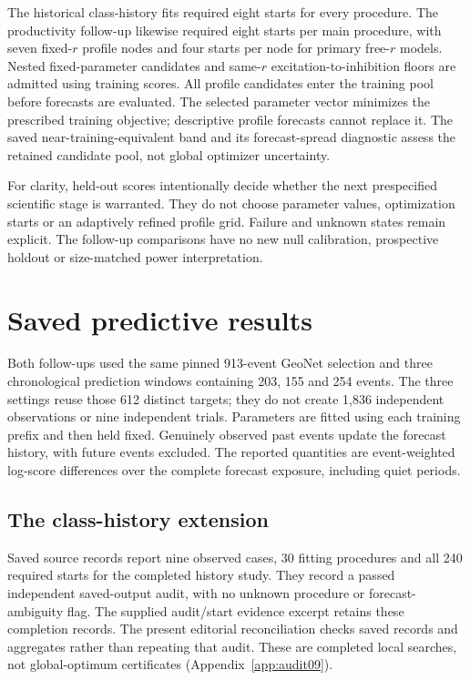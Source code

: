 The historical class-history fits required eight starts for every
procedure. The productivity follow-up likewise required eight starts per
main procedure, with seven fixed-\(r\) profile nodes and four starts per
node for primary free-\(r\) models. Nested fixed-parameter candidates and
same-\(r\) excitation-to-inhibition floors are admitted using training
scores. All profile candidates enter the training pool before forecasts
are evaluated. The selected parameter vector minimizes the prescribed
training objective; descriptive profile forecasts cannot replace it.
The saved near-training-equivalent band and its forecast-spread diagnostic
assess the retained candidate pool, not global optimizer uncertainty.

For clarity, held-out scores intentionally decide whether the next
prespecified scientific stage is warranted. They do not choose parameter
values, optimization starts or an adaptively refined profile grid.
Failure and unknown states remain explicit. The follow-up comparisons
have no new null calibration, prospective holdout or size-matched power
interpretation.

\section{Saved predictive results}
\label{a2:results}

Both follow-ups used the same pinned 913-event GeoNet selection and three
chronological prediction windows containing 203, 155 and 254 events.
The three settings reuse those 612 distinct targets; they do not create
1,836 independent observations or nine independent trials. Parameters are
fitted using each training prefix and then held fixed. Genuinely observed
past events update the forecast history, with future events excluded.
The reported quantities are event-weighted log-score differences over the
complete forecast exposure, including quiet periods.

\subsection{The class-history extension}

Saved source records report nine observed cases, 30 fitting procedures
and all 240 required starts for the completed history study. They record
a passed independent saved-output audit, with no unknown procedure or
forecast-ambiguity flag. The supplied audit/start evidence excerpt retains
these completion records. The present editorial reconciliation checks
saved records and aggregates rather than repeating that audit. These are
completed local searches, not global-optimum certificates
(Appendix~\ref{app:audit09}).

